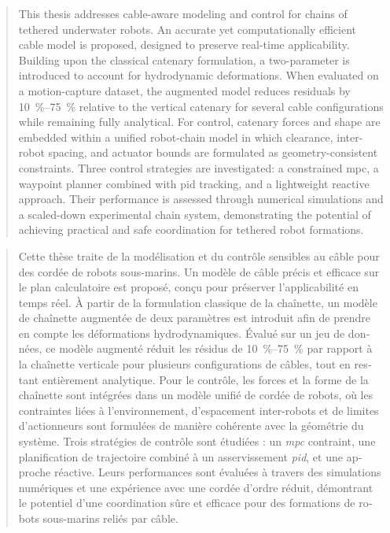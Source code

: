 \thispagestyle{empty}

\begin{vplace}

	\begin{abstract}

		This thesis addresses cable-aware modeling and control for chains of tethered underwater robots. An
		accurate yet computationally efficient cable model is proposed, designed to preserve real-time
		applicability. Building upon the classical catenary formulation, a two-parameter \augmentedmodel{}
		is introduced to account for hydrodynamic deformations. When evaluated on a motion-capture dataset,
		the augmented model reduces residuals by \qtyrange{10}{75}{\percent} relative to the vertical
		catenary for several cable configurations while remaining fully analytical. For control, catenary
		forces and shape are embedded within a unified robot-chain model in which clearance, inter-robot
		spacing, and actuator bounds are formulated as geometry-consistent constraints. Three control
		strategies are investigated: a constrained \acl{mpc}, a waypoint planner combined with \acl{pid}
		tracking, and a lightweight reactive approach. Their performance is assessed through numerical
		simulations and a scaled-down experimental chain system, demonstrating the potential of achieving
		practical and safe coordination for tethered robot formations.

	\end{abstract}

	\begin{otherlanguage}{french}


		\begin{abstract}

			Cette thèse traite de la modélisation et du contrôle sensibles au câble pour des cordée de robots
			sous-marins. Un modèle de câble précis et efficace sur le plan calculatoire est proposé, conçu pour
			préserver l'applicabilité en temps réel. À partir de la formulation classique de la chaînette, un
			modèle de chaînette augmentée de deux paramètres est introduit afin de prendre en compte les
			déformations hydrodynamiques. Évalué sur un jeu de données, ce modèle augmenté réduit les résidus
			de \qtyrange{10}{75}{\percent} par rapport à la chaînette verticale pour plusieurs configurations
			de câbles, tout en restant entièrement analytique. Pour le contrôle, les forces et la forme de la
			chaînette sont intégrées dans un modèle unifié de cordée de robots, où les contraintes liées à
			l'environnement, d'espacement inter-robots et de limites d'actionneurs sont formulées de manière
			cohérente avec la géométrie du système. Trois stratégies de contrôle sont étudiées : un
			\emph{\acl{mpc}} contraint, une planification de trajectoire combiné à un asservissement
			\emph{\acl{pid}}, et une approche réactive. Leurs performances sont évaluées à travers des
			simulations numériques et une expérience avec une cordée d'ordre réduit, démontrant le potentiel
			d'une coordination sûre et efficace pour des formations de robots sous-marins reliés par câble.


\end{abstract}
\end{otherlanguage}
\end{vplace}
